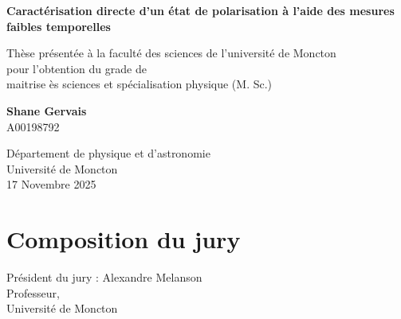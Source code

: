 \documentclass[superscriptaddress,12pt]{article}
\newcommand\tab[1][0.83cm]{\hspace*{#1}}
\begin{document}

    \thispagestyle{empty}
    \begin{titlepage}
       \begin{center}
           \vspace*{1cm}


           \textbf{Caractérisation directe d'un état de polarisation à l'aide des mesures faibles temporelles}


           \vspace{5cm}


            Thèse présentée à la faculté des sciences de l'université de Moncton \\
            pour l'obtention du grade de \\
            maitrise ès sciences et spécialisation physique (M. Sc.)

           \vspace{5cm}


           \textbf{Shane Gervais} \\
           A00198792


           \vfill

           Département de physique et d'astronomie \\
           Université de Moncton\\
           17 Novembre 2025

           \vspace{0.8cm}

       \end{center}
    \end{titlepage}




    \section*{Composition du jury}
    \setcounter{page}{2}



    \vspace{1.5cm}


    Président du jury : Alexandre Melanson \\
    \tab \tab Professeur, \\
    \tab \tab Université de Moncton


    \vspace{3cm}
\end{document}
